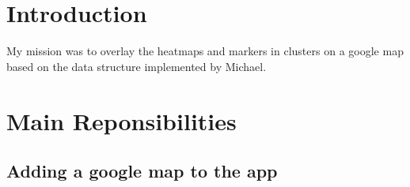 \documentclass[10pt,a4paper]{article} %
\begin{document}
    \pagestyle{plain}
    \title{\rmfamily\normalfont{}}
    \author{}
    \date{} %
    
    \maketitle
    
       
    \tableofcontents


	

    
    \section{Introduction}
	My mission was to overlay the heatmaps and markers in clusters on a google map based on the data structure implemented by Michael.

    \section{Main Reponsibilities}
	
	\subsection{Adding a google map to the app}\label{subsec:map}
	
\end{document}
